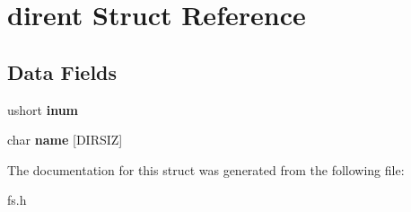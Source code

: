 \hypertarget{structdirent}{}\section{dirent Struct Reference}
\label{structdirent}
\subsection*{Data Fields}
\begin{DoxyCompactItemize}
\item 
\mbox{\label{structdirent_a68698c303a46d2a34232a2226629ac79}} 
ushort {\bfseries inum}
\item 
\mbox{\label{structdirent_a4e08a84dbac9b9f6a3e006151855d14d}} 
char {\bfseries name} \mbox{[}D\+I\+R\+S\+IZ\mbox{]}
\end{DoxyCompactItemize}


The documentation for this struct was generated from the following file\+:\begin{DoxyCompactItemize}
\item 
fs.\+h\end{DoxyCompactItemize}
